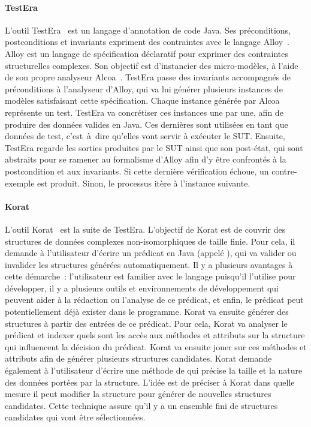\paragraph{TestEra} L'outil TestEra~ est un langage
d'annotation de code Java. Ses préconditions, postconditions et invariants
expriment des contraintes avec le langage Alloy~. Alloy est un
langage de spécification déclaratif pour exprimer des contraintes structurelles
complexes. Son objectif est d'instancier des micro-modèles, à l'aide de son
propre analyseur Alcoa~. TestEra passe des invariants
accompagnés de préconditions à l'analyseur d'Alloy, qui va lui générer plusieurs
instances de modèles satisfaisant cette spécification. Chaque instance générée
par Alcoa représente un test. TestEra va concrétiser ces instances une par une,
afin de produire des données valides en Java. Ces dernières sont utilisées en
tant que données de test, c'est~à~dire qu'elles vont servir à exécuter le SUT.
Ensuite, TestEra regarde les sorties produites par le SUT ainsi que son
post-état, qui sont abstraits pour se ramener au formalisme d'Alloy afin d'y
être confrontés à la postcondition et aux invariants. Si cette dernière
vérification échoue, un contre-exemple est produit. Sinon, le processus itère à
l'instance suivante.

\paragraph{Korat} L'outil Korat~ est la suite de TestEra.
L'objectif de Korat est de couvrir des structures de données
complexes non-isomorphiques de taille finie. Pour cela, il demande à
l'utilisateur d'écrire un prédicat en Java (appelé ), qui va valider
ou invalider les structures générées automatiquement. Il y a plusieurs avantages
à cette démarche~: l'utilisateur est familier avec le langage puisqu'il
l'utilise pour développer, il y a plusieurs outils et environnements de
développement qui peuvent aider à la rédaction ou l'analyse de ce prédicat, et
enfin, le prédicat peut potentiellement déjà exister dans le programme. Korat va
ensuite générer des structures à partir des entrées de ce prédicat. Pour cela,
Korat va analyser le prédicat et indexer quels sont les accès aux méthodes et
attributs sur la structure qui influencent la décision du prédicat. Korat va
ensuite jouer sur ces méthodes et attributs afin de générer plusieurs structures
candidates. Korat demande également à l'utilisateur d'écrire une méthode de
 qui précise la taille et la nature des données portées
par la structure. L'idée est de préciser à Korat dans quelle mesure il peut
modifier la structure pour générer de nouvelles structures candidates. Cette
technique assure qu'il y a un ensemble fini de structures candidates qui vont
être sélectionnées.

